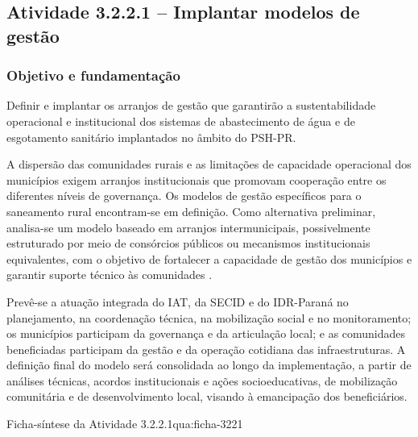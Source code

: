 \subsection{Atividade 3.2.2.1 -- Implantar modelos de gestão}
\label{subsec:modelos-gestao}

\subsubsection{Objetivo e fundamentação}

Definir e implantar os arranjos de gestão que garantirão a sustentabilidade
operacional e institucional dos sistemas de abastecimento de água e de
esgotamento sanitário implantados no âmbito do PSH-PR.

A dispersão das comunidades rurais e as limitações de capacidade operacional
dos municípios exigem arranjos institucionais que promovam cooperação entre
os diferentes níveis de governança. Os modelos de gestão específicos para o
saneamento rural encontram-se em definição. Como alternativa preliminar,
analisa-se um modelo baseado em arranjos intermunicipais, possivelmente
estruturado por meio de consórcios públicos ou mecanismos institucionais
equivalentes, com o objetivo de fortalecer a capacidade de gestão dos
municípios e garantir suporte técnico às comunidades \cite{mop2026}.

Prevê-se a atuação integrada do IAT, da SECID e do IDR-Paraná no
planejamento, na coordenação técnica, na mobilização social e no
monitoramento; os municípios participam da governança e da articulação
local; e as comunidades beneficiadas participam da gestão e da operação
cotidiana das infraestruturas. A definição final do modelo será consolidada
ao longo da implementação, a partir de análises técnicas, acordos
institucionais e ações socioeducativas, de mobilização comunitária e de
desenvolvimento local, visando à emancipação dos beneficiários.

\begin{fichaatividade}{Ficha-síntese da Atividade 3.2.2.1}{qua:ficha-3221}
\end{fichaatividade}

